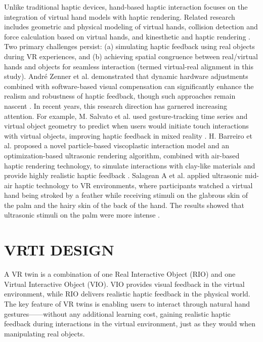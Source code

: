 \documentclass[sigconf,review,anonymous]{acmart}
\begin{document}
Unlike traditional haptic devices, hand-based haptic interaction focuses on the integration of virtual hand models with haptic rendering. Related research includes geometric and physical modeling of virtual hands, collision detection and force calculation based on virtual hands, and kinesthetic and haptic rendering \cite{tong2023survey}. Two primary challenges persist: (a) simulating haptic feedback using real objects during VR experiences, and (b) achieving spatial congruence between real/virtual hands and objects for seamless interaction (termed virtual-real alignment in this study). André Zenner et al. demonstrated that dynamic hardware adjustments combined with software-based visual compensation can significantly enhance the realism and robustness of haptic feedback, though such approaches remain nascent \cite{zenner2021combining}. In recent years, this research direction has garnered increasing attention. For example, M. Salvato et al. used gesture-tracking time series and virtual object geometry to predict when users would initiate touch interactions with virtual objects, improving haptic feedback in mixed reality \cite{salvato2022predicting}. H. Barreiro et al. proposed a novel particle-based viscoplastic interaction model and an optimization-based ultrasonic rendering algorithm, combined with air-based haptic rendering technology, to simulate interactions with clay-like materials and provide highly realistic haptic feedback \cite{barreiro2021natural}. Salagean A et al. applied ultrasonic mid-air haptic technology to VR environments, where participants watched a virtual hand being stroked by a feather while receiving stimuli on the glabrous skin of the palm and the hairy skin of the back of the hand. The results showed that ultrasonic stimuli on the palm were more intense \cite{salagean2022virtual}.

\section{VRTI DESIGN}
A VR twin is a combination of one Real Interactive Object (RIO) and one Virtual Interactive Object (VIO). VIO provides visual feedback in the virtual environment, while RIO delivers realistic haptic feedback in the physical world. The key feature of VR twins is enabling users to interact through natural hand gestures——without any additional learning cost, gaining realistic haptic feedback during interactions in the virtual environment, just as they would when manipulating real objects.
\end{document}
